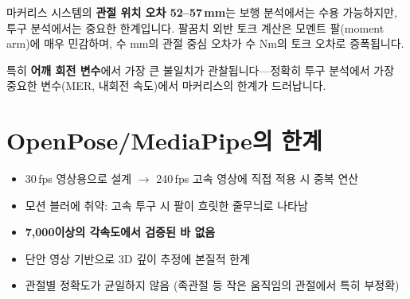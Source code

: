 \documentclass[11pt, a4paper]{report}
\begin{document}
\begin{clinicalnote}
마커리스 시스템의 \textbf{관절 위치 오차 52--57\,mm}는 보행 분석에서는 수용 가능하지만, 투구 분석에서는 중요한 한계입니다. 팔꿈치 외반 토크 계산은 모멘트 팔(moment arm)에 매우 민감하며, 수 mm의 관절 중심 오차가 수 Nm의 토크 오차로 증폭됩니다.

특히 \textbf{어깨 회전 변수}에서 가장 큰 불일치가 관찰됩니다---정확히 투구 분석에서 가장 중요한 변수(MER, 내회전 속도)에서 마커리스의 한계가 드러납니다.
\end{clinicalnote}


\section{OpenPose/MediaPipe의 한계}

\begin{itemize}[leftmargin=*]
  \item 30\,fps 영상용으로 설계 $\rightarrow$ 240\,fps 고속 영상에 직접 적용 시 중복 연산
  \item 모션 블러에 취약: 고속 투구 시 팔이 흐릿한 줄무늬로 나타남
  \item \textbf{7,000\degps 이상의 각속도에서 검증된 바 없음}
  \item 단안 영상 기반으로 3D 깊이 추정에 본질적 한계
  \item 관절별 정확도가 균일하지 않음 (족관절 등 작은 움직임의 관절에서 특히 부정확)
\end{itemize}
\end{document}
